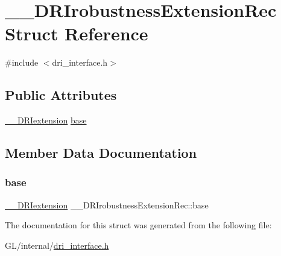 \hypertarget{struct_____d_r_irobustness_extension_rec}{}\section{\+\_\+\+\_\+\+D\+R\+Irobustness\+Extension\+Rec Struct Reference}
\label{struct_____d_r_irobustness_extension_rec}


{\ttfamily \#include $<$dri\+\_\+interface.\+h$>$}

\subsection*{Public Attributes}
\begin{DoxyCompactItemize}
\item 
\hyperlink{dri__interface_8h_a4e0a61c8ece00d2b2c6792a9a1b55385}{\+\_\+\+\_\+\+D\+R\+Iextension} \hyperlink{struct_____d_r_irobustness_extension_rec_ada3cfee6b3ffb29873a9b7913373a585}{base}
\end{DoxyCompactItemize}


\subsection{Member Data Documentation}
\mbox{\label{struct_____d_r_irobustness_extension_rec_ada3cfee6b3ffb29873a9b7913373a585}} 
\subsubsection{\texorpdfstring{base}{base}}
{\footnotesize\ttfamily \hyperlink{dri__interface_8h_a4e0a61c8ece00d2b2c6792a9a1b55385}{\+\_\+\+\_\+\+D\+R\+Iextension} \+\_\+\+\_\+\+D\+R\+Irobustness\+Extension\+Rec\+::base}



The documentation for this struct was generated from the following file\+:\begin{DoxyCompactItemize}
\item 
G\+L/internal/\hyperlink{dri__interface_8h}{dri\+\_\+interface.\+h}\end{DoxyCompactItemize}
